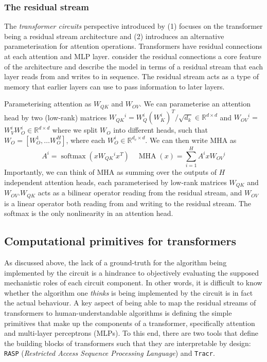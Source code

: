 \documentclass[11pt]{scrartcl}
\begin{document}
\subsubsection{The residual stream}
The \textit{transformer circuits} perspective introduced by \textcite{elhage2021mathematical} (1) focuses on the transformer being a residual stream architecture and (2) introduces an alternative parameterisation for attention operations. Transformers have residual connections at each attention and MLP layer. \textcite{elhage2021mathematical} consider the residual connections a core feature of the architecture and describe the model in terms of a residual stream that each layer reads from and writes to in sequence. The residual stream acts as a type of memory that earlier layers can use to pass information to later layers.

Parameterising attention as $W_{Q K}$ and $W_{O V}$. We can parameterise an attention head by two (low-rank) matrices $W_{Q K}{ }^i=W_Q^i\left(W_K^i\right)^T / \sqrt{d_k} \in \mathbb{R}^{d \times d}$ and $W_{O V}{ }^i=$ $W_V^i W_O^i \in \mathbb{R}^{d \times d}$ where we split $W_O$ into different heads, such that $W_O=\left[W_O^1, \ldots W_O^H\right]$, where each $W_O^i \in \mathbb{R}^{d_v \times d}$. We can then write MHA as
$$
A^i=\operatorname{softmax}\left(x W_{Q K}{ }^i x^T\right) \quad \operatorname{MHA}(x)=\sum_{i=1}^H A^i x W_{O V}{ }^i
$$
Importantly, we can think of MHA as summing over the outputs of $H$ independent attention heads, each parameterised by low-rank matrices $W_{Q K}$ and $W_{O V} . W_{Q K}$ acts as a bilinear operator reading from the residual stream, and $W_{O V}$ is a linear operator both reading from and writing to the residual stream. The softmax is the only nonlinearity in an attention head.


\subsection{Computational primitives for transformers}
As discussed above, the lack of a ground-truth for the algorithm being implemented by the circuit is a hindrance to objectively evaluating the supposed mechanistic roles of each circuit component. In other words, it is difficult to know whether the algorithm one \textit{thinks} is being implemented by the circuit is in fact the actual behaviour.
A key aspect of being able to map the residual streams of transformers to human-understandable algorithms is defining the simple primitives that make up the components of a transformer, specifically attention and multi-layer perceptrons (MLPs). To this end, there are two tools that define the building blocks of transformers such that they are interpretable by design: \texttt{RASP} (\textit{Restricted Access Sequence Processing Language}) and \texttt{Tracr}.
\end{document}
